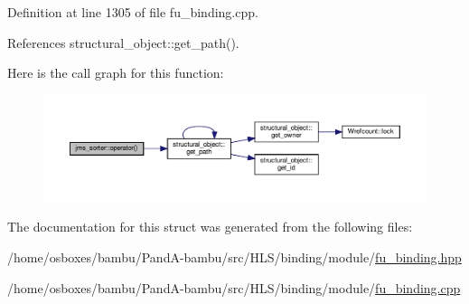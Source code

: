 Definition at line 1305 of file fu\+\_\+binding.\+cpp.



References structural\+\_\+object\+::get\+\_\+path().

Here is the call graph for this function\+:
\nopagebreak
\begin{figure}[H]
\begin{center}
\leavevmode
\includegraphics[width=350pt]{dd/d8b/structjms__sorter_a7b39dc52725c7f0b3bb0a94b51bc319d_cgraph}
\end{center}
\end{figure}


The documentation for this struct was generated from the following files\+:\begin{DoxyCompactItemize}
\item 
/home/osboxes/bambu/\+Pand\+A-\/bambu/src/\+H\+L\+S/binding/module/\hyperlink{fu__binding_8hpp}{fu\+\_\+binding.\+hpp}\item 
/home/osboxes/bambu/\+Pand\+A-\/bambu/src/\+H\+L\+S/binding/module/\hyperlink{fu__binding_8cpp}{fu\+\_\+binding.\+cpp}\end{DoxyCompactItemize}

